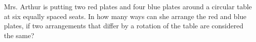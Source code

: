 Mrs. Arthur is putting two red plates and four blue plates around a circular table at six equally spaced seats. In how many ways can she arrange the red and blue plates, if two arrangements that differ by a rotation of the table are considered the same?
